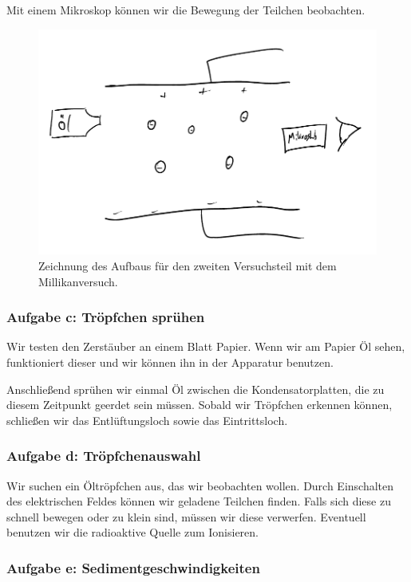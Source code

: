 \documentclass[11pt, ngerman]{article}
\begin{document}
Mit einem Mikroskop können wir die Bewegung der Teilchen beobachten.

\begin{figure}[h!]
	\centering
	\includegraphics[width=\textwidth]{Aufbau_Millikanversuch.pdf}
	\caption{Zeichnung des Aufbaus für den zweiten Versuchsteil mit dem
	Millikanversuch.}
	\label{fig:Millikanversuch}
\end{figure}

\subsubsection{Aufgabe c: Tröpfchen sprühen}

Wir testen den Zerstäuber an einem Blatt Papier. Wenn wir am Papier Öl sehen,
funktioniert dieser und wir können ihn in der Apparatur benutzen.

Anschließend sprühen wir einmal Öl zwischen die Kondensatorplatten, die zu
diesem Zeitpunkt geerdet sein müssen. Sobald wir Tröpfchen erkennen können,
schließen wir das Entlüftungsloch sowie das Eintrittsloch.

\subsubsection{Aufgabe d: Tröpfchenauswahl}

Wir suchen ein Öltröpfchen aus, das wir beobachten wollen. Durch Einschalten
des elektrischen Feldes können wir geladene Teilchen finden. Falls sich diese
zu schnell bewegen oder zu klein sind, müssen wir diese verwerfen. Eventuell
benutzen wir die radioaktive Quelle zum Ionisieren.

\subsubsection{Aufgabe e: Sedimentgeschwindigkeiten}
\end{document}
